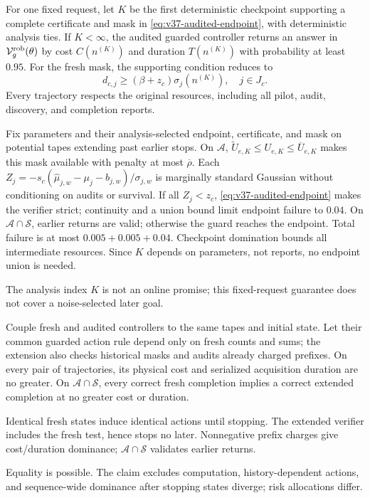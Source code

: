 \begin{theorem}
\label{thm:v37-guarded-completion}
\label{thm:v37-audited-completion}
For one fixed request, let $K$ be the first deterministic checkpoint supporting a complete certificate and mask in \eqref{eq:v37-audited-endpoint}, with deterministic analysis ties. If $K<\infty$, the audited guarded controller returns an answer in $\mathcal V_g^{\rm rob}(\theta)$ by cost $C(n^{(K)})$ and duration $T(n^{(K)})$ with probability at least $0.95$. For the fresh mask, the supporting condition reduces to
\begin{equation}
d_{c,j}\geq(\beta+z_c)\sigma_j(n^{(K)}),\quad j\in J_c.
\label{eq:v37-fresh-endpoint}
\end{equation}
Every trajectory respects the original resources, including all pilot, audit, discovery, and completion reports.
\end{theorem}
\begin{IEEEproof}
Fix parameters and their analysis-selected endpoint, certificate, and mask on potential tapes extending past earlier stops. On $\mathcal A$, $\widetilde U_{e,K}\leq U_{e,K}\leq\overline U_{e,K}$ makes this mask available with penalty at most $\overline\rho$. Each $Z_j=-s_c(\widehat\mu_{j,w}-\mu_j-b_{j,w})/\sigma_{j,w}$ is marginally standard Gaussian without conditioning on audits or survival. If all $Z_j<z_c$, \eqref{eq:v37-audited-endpoint} makes the verifier strict; continuity and a union bound limit endpoint failure to $0.04$. On $\mathcal A\cap\mathcal S$, earlier returns are valid; otherwise the guard reaches the endpoint. Total failure is at most $0.005+0.005+0.04$. Checkpoint domination bounds all intermediate resources. Since $K$ depends on parameters, not reports, no endpoint union is needed.
\end{IEEEproof}
The analysis index $K$ is not an online promise; this fixed-request guarantee does not cover a noise-selected later goal.

\begin{proposition}
\label{prop:v37-fixed-actions}
Couple fresh and audited controllers to the same tapes and initial state. Let their common guarded action rule depend only on fresh counts and sums; the extension also checks historical masks and audits already charged prefixes. On every pair of trajectories, its physical cost and serialized acquisition duration are no greater. On $\mathcal A\cap\mathcal S$, every correct fresh completion implies a correct extended completion at no greater cost or duration.
\end{proposition}
\begin{IEEEproof}
Identical fresh states induce identical actions until stopping. The extended verifier includes the fresh test, hence stops no later. Nonnegative prefix charges give cost/duration dominance; $\mathcal A\cap\mathcal S$ validates earlier returns.
\end{IEEEproof}
Equality is possible. The claim excludes computation, history-dependent actions, and sequence-wide dominance after stopping states diverge; risk allocations differ.

